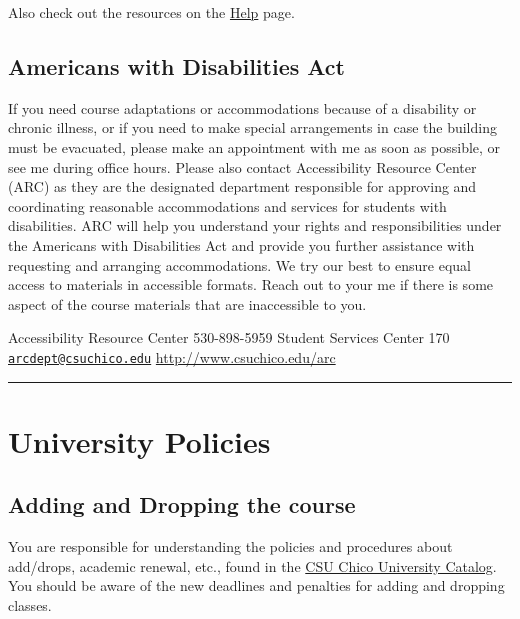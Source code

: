 \documentclass[
  letterpaper,
  DIV=11,
  numbers=noendperiod]{scrartcl}
\begin{document}
Also check out the resources on the \href{help.html}{Help} page.

\hypertarget{americans-with-disabilities-act}{%
\subsection{Americans with Disabilities
Act}\label{americans-with-disabilities-act}}

If you need course adaptations or accommodations because of a disability
or chronic illness, or if you need to make special arrangements in case
the building must be evacuated, please make an appointment with me as
soon as possible, or see me during office hours. Please also contact
Accessibility Resource Center (ARC) as they are the designated
department responsible for approving and coordinating reasonable
accommodations and services for students with disabilities. ARC will
help you understand your rights and responsibilities under the Americans
with Disabilities Act and provide you further assistance with requesting
and arranging accommodations. We try our best to ensure equal access to
materials in accessible formats. Reach out to your me if there is some
aspect of the course materials that are inaccessible to you.

Accessibility Resource Center 530-898-5959 Student Services Center 170
\href{mailto:arcdept@csuchico.edu}{\nolinkurl{arcdept@csuchico.edu}}
\href{https://www.csuchico.edu/arc/}{http://www.csuchico.edu/arc}

\begin{center}\rule{0.5\linewidth}{0.5pt}\end{center}

\hypertarget{university-policies}{%
\section{University Policies}\label{university-policies}}

\hypertarget{adding-and-dropping-the-course}{%
\subsection{Adding and Dropping the
course}\label{adding-and-dropping-the-course}}

You are responsible for understanding the policies and procedures about
add/drops, academic renewal, etc., found in the
\href{http://www.csuchico.edu/catalog/}{CSU Chico University Catalog}.
You should be aware of the new deadlines and penalties for adding and
dropping classes.
\end{document}
